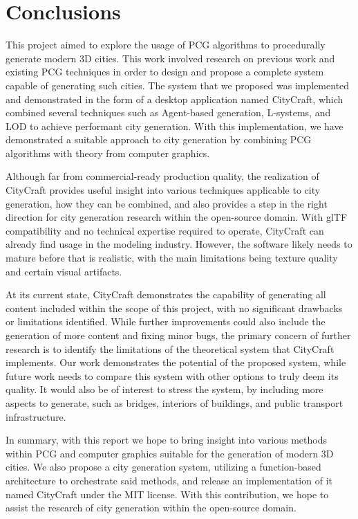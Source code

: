 \chapter{Conclusions}


This project aimed to explore the usage of PCG algorithms to procedurally generate modern 3D cities.
This work involved research on previous work and existing PCG techniques in order to design and propose a complete system capable of generating such cities.
The system that we proposed was implemented and demonstrated in the form of a desktop application named CityCraft, which combined several techniques such as Agent-based generation, L-systems, and LOD to achieve performant city generation.
With this implementation, we have demonstrated a suitable approach to city generation by combining PCG algorithms with theory from computer graphics.

Although far from commercial-ready production quality, the realization of CityCraft provides useful insight into various techniques applicable to city generation, how they can be combined, and also provides a step in the right direction for city generation research within the open-source domain.
With glTF compatibility and no technical expertise required to operate, CityCraft can already find usage in the modeling industry.
However, the software likely needs to mature before that is realistic, with the main limitations being texture quality and certain visual artifacts.

At its current state, CityCraft demonstrates the capability of generating all content included within the scope of this project, with no significant drawbacks or limitations identified.
While further improvements could also include the generation of more content and fixing minor bugs, the primary concern of further research is to identify the limitations of the theoretical system that CityCraft implements.
Our work demonstrates the potential of the proposed system, while future work needs to compare this system with other options to truly deem its quality.
It would also be of interest to stress the system, by including more aspects to generate, such as bridges, interiors of buildings, and public transport infrastructure.

In summary, with this report we hope to bring insight into various methods within PCG and computer graphics suitable for the generation of modern 3D cities.
We also propose a city generation system, utilizing a function-based architecture to orchestrate said methods, and release an implementation of it named CityCraft under the MIT license.
With this contribution, we hope to assist the research of city generation within the open-source domain.
